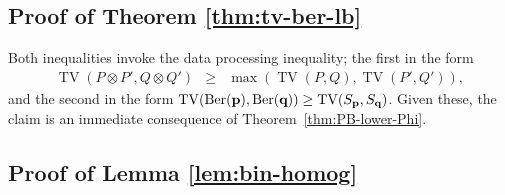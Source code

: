 \documentclass[11pt]{amsart}
\theoremstyle{plain}
\theoremstyle{definition}
\DeclareMathOperator{\TV}{TV}
\DeclareMathOperator{\Ber}{Ber}
\newcommand{\beq}{\begin{eqnarray*}}
\newcommand{\eeq}{\end{eqnarray*}}
\renewcommand{\vec}[1]{\textup{{\bf #1}}}
\begin{document}
\subsection{Proof of Theorem \ref{thm:tv-ber-lb}}
Both inequalities invoke the data processing inequality;
the first in the form
\beq
\TV(P\otimes P',Q\otimes Q')
&\ge&
\max(
\TV(P,Q)
,
\TV(P',Q')
),
\eeq
and the second in the form
$
\TV(\Ber(\vec{p}),\Ber(\vec{q}))
\ge
\TV(S_{\vec{p}},S_{\vec{q}})
$.
Given these, the claim is
an immediate consequence of Theorem~\ref{thm:PB-lower-Phi}.

\subsection{Proof of Lemma \ref{lem:bin-homog}}
\newcommand{\nI}{|I|}
\newcommand{\nJ}{|J|}
\end{document}
